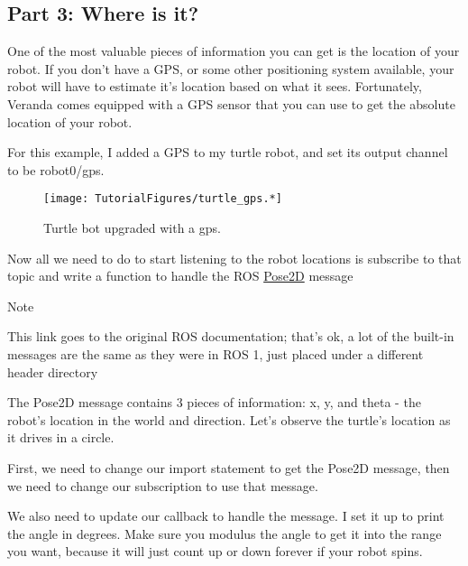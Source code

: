 \hypertarget{part-3-where-is-it}{%
\subsection{Part 3: Where is it?}\label{part-3-where-is-it}}

One of the most valuable pieces of information you can get is the
location of your robot. If you don't have a GPS, or some other
positioning system available, your robot will have to estimate it's
location based on what it sees. Fortunately, Veranda comes equipped with
a GPS sensor that you can use to get the absolute location of your
robot.

For this example, I added a GPS to my turtle robot, and set its output
channel to be robot0/gps.

\begin{figure}
\centering
\texttt{[image: TutorialFigures/turtle\_gps.*]}
\caption{Turtle bot upgraded with a gps.}
\end{figure}

Now all we need to do to start listening to the robot locations is
subscribe to that topic and write a function to handle the ROS
\href{http://docs.ros.org/lunar/api/geometry_msgs/html/msg/Pose2D.html}{Pose2D}
message

Note

This link goes to the original ROS documentation; that's ok, a lot of
the built-in messages are the same as they were in ROS 1, just placed
under a different header directory

The Pose2D message contains 3 pieces of information: x, y, and theta -
the robot's location in the world and direction. Let's observe the
turtle's location as it drives in a circle.

First, we need to change our import statement to get the Pose2D message,
then we need to change our subscription to use that message.

\begin{Shaded}
\begin{Highlighting}[]
\OperatorTok{=}
\end{Highlighting}
\end{Shaded}

We also need to update our callback to handle the message. I set it up
to print the angle in degrees. Make sure you modulus the angle to get it
into the range you want, because it will just count up or down forever
if your robot spins.

